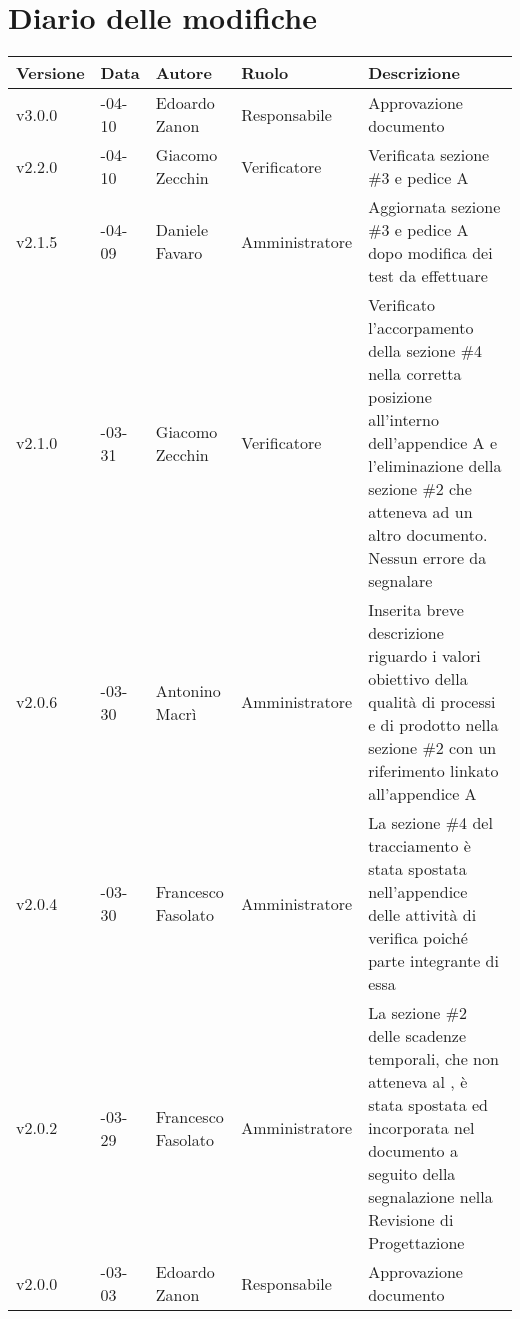 \vspace*{-10mm}
\section*{Diario delle modifiche}

\begin{longtable} { >{\centering}p{1.4cm} >{\centering}p{2cm} >{\centering}p{2.3cm} >{\centering}p{2.7cm} p{5.5cm} }
	\toprule
	\textbf{Versione} & \textbf{Data} & \textbf{Autore} & \textbf{Ruolo} & \centerline{\textbf{Descrizione}} \\
	\midrule
	\arrayrulecolor{gray}
	v3.0.0 & 2017-04-10 & Edoardo Zanon & Responsabile & Approvazione documento \\
	\addlinespace[0.4em]
	\midrule
	\addlinespace[0.4em]
	v2.2.0 & 2017-04-10 & Giacomo Zecchin & Verificatore & Verificata sezione \#3 e pedice A \\
	\addlinespace[0.4em]
	\midrule
	\addlinespace[0.4em]
	v2.1.5 & 2017-04-09 & Daniele Favaro & Amministratore & Aggiornata sezione \#3 e pedice A dopo modifica dei test da effettuare \\
	\addlinespace[0.4em]
	\midrule
	\addlinespace[0.4em]
	v2.1.0 & 2017-03-31 & Giacomo Zecchin & Verificatore & Verificato l'accorpamento della sezione \#4 nella corretta posizione all'interno dell'appendice A e l'eliminazione della sezione \#2 che atteneva ad un altro documento. Nessun errore da segnalare\\
	\addlinespace[0.4em]
	\midrule
	\addlinespace[0.4em]
	v2.0.6 & 2017-03-30 & Antonino Macrì & Amministratore & Inserita breve descrizione riguardo i valori obiettivo della qualità di processi e di prodotto nella sezione \#2 con un riferimento linkato all'appendice A \\  
	\addlinespace[0.4em]
	\midrule
	\addlinespace[0.4em]
	v2.0.4 & 2017-03-30 & Francesco Fasolato & Amministratore & La sezione \#4 del tracciamento è stata spostata nell'appendice delle attività di verifica poiché parte integrante di essa \\ 
	\addlinespace[0.4em]
	\midrule
	\addlinespace[0.4em]
	v2.0.2 & 2017-03-29 & Francesco Fasolato & Amministratore & La sezione \#2 delle scadenze temporali, che non atteneva al \pianodiqualifica, è stata spostata ed incorporata nel documento \pianodiprogetto a seguito della segnalazione nella Revisione di Progettazione \\ 
	\addlinespace[0.4em]
	\midrule
	\addlinespace[0.4em]	
	v2.0.0 & 2017-03-03 & Edoardo Zanon & Responsabile & Approvazione documento \\ 

\end{longtable}
